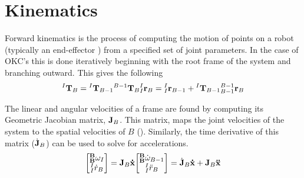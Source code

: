 \chapter{Kinematics} %
Forward kinematics is the process of computing the motion of points on a robot (typically an end-effector \cite{paul_1992}) from a specified set of joint parameters. In the case of OKC's this is done iteratively beginning with the root frame of the system and branching outward. This gives the following
\begin{align}
	\begin{split}                                                           
	{^I\mathbf{T}_B} = {^I\mathbf{T}_{B-1}}{^{B - 1}\mathbf{T}_{B}}                                 
	\end{split}                                                             
	\begin{split}                                                           
	{^I_I\mathbf{r}_B} =  {^I_I\mathbf{r}_{B - 1}} + {^{I}\mathbf{T}_{B-1}}{^{B - 1}_{B - 1}\mathbf{r}_{B}} 
	\end{split}                                                             
\end{align}

\noindent The linear and angular velocities of a frame are found by computing its Geometric Jacobian matrix, $\mathbf{J}_B$. This matrix, maps the joint velocities of the system to the spatial velocities of $B$ (\cite{shabana_2010}). Similarly, the time derivative of this matrix ($\dot{\mathbf{J}}_B$) can be used to solve for accelerations.
\begin{align*}
	\begin{split}                               
	\begin{bmatrix}                             
	{^\mathbf{B}_\mathbf{B}\omega_{I}}                             \\
	{^I_I\dot{r}_B}                             
	\end{bmatrix} = \mathbf{J}_B {\mathbf{\dot{x}}}                  
	\end{split}                                 
	\begin{split}                               
	\begin{bmatrix}                             
	{^\mathbf{B}_\mathbf{B}\dot{\omega}_{B - 1}}                  \\
	{^I_I\ddot{r}_B}                            
	\end{bmatrix} = \dot{\mathbf{J}}_B {\mathbf{\dot{x}}} + \mathbf{J}_B {\mathbf{\Ddot{x}}} 
	\end{split}                                 
\end{align*}

